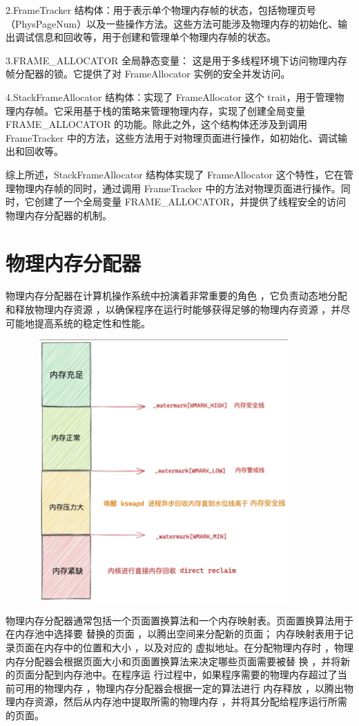 \documentclass[12pt, a4paper]{ctexart}
\begin{document}
2.FrameTracker 结构体：用于表示单个物理内存帧的状态，包括物理页号（PhysPageNum）以及一些操作方法。这些方法可能涉及物理内存的初始化、输出调试信息和回收等，用于创建和管理单个物理内存帧的状态。

3.FRAME\_ALLOCATOR 全局静态变量： 这是用于多线程环境下访问物理内存帧分配器的锁。它提供了对 FrameAllocator 实例的安全并发访问。

4.StackFrameAllocator 结构体：实现了 FrameAllocator 这个 trait，用于管理物理内存帧。它采用基于栈的策略来管理物理内存，实现了创建全局变量FRAME\_ALLOCATOR 的功能。除此之外，这个结构体还涉及到调用 FrameTracker 中的方法，这些方法用于对物理页面进行操作，如初始化、调试输出和回收等。

综上所述，StackFrameAllocator 结构体实现了 FrameAllocator 这个特性，它在管理物理内存帧的同时，通过调用 FrameTracker 中的方法对物理页面进行操作。同时，它创建了一个全局变量 FRAME\_ALLOCATOR，并提供了线程安全的访问物理内存分配器的机制。

 
	\section{物理内存分配器}
	物理内存分配器在计算机操作系统中扮演着非常重要的角色 ，它负责动态地分配和释放物理内存资源 ，以确保程序在运行时能够获得足够的物理内存资源 ，并尽可能地提高系统的稳定性和性能。
	\begin{figure}[h]
		\centering
		\includegraphics[width=10cm,height=10cm]{3.png}
	\end{figure}   
 
	物理内存分配器通常包括一个页面置换算法和一个内存映射表。页面置换算法用于在内存池中选择要 替换的页面 ，以腾出空间来分配新的页面； 内存映射表用于记录页面在内存中的位置和大小 ，以及对应的 虚拟地址。在分配物理内存时 ，物理内存分配器会根据页面大小和页面置换算法来决定哪些页面需要被替 换 ，并将新的页面分配到内存池中。在程序运 行过程中，如果程序需要的物理内存超过了当前可用的物理内存 ，物理内存分配器会根据一定的算法进行 内存释放 ，以腾出物理内存资源，然后从内存池中提取所需的物理内存 ，并将其分配给程序运行所需的页面。
\end{document}
